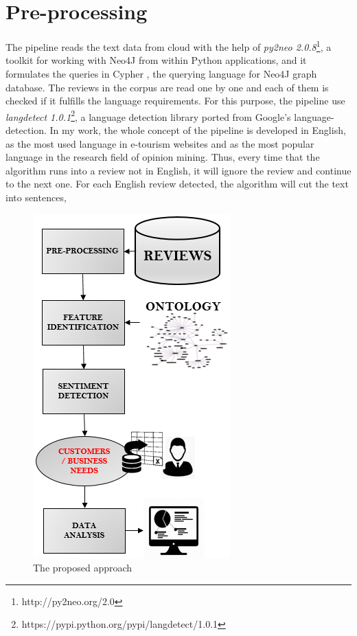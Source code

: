 \section{Pre-processing}
%
The pipeline reads the text data from cloud with the help of \textit{py2neo 2.0.8}\footnote{http://py2neo.org/2.0}, a toolkit for working with Neo4J from within Python applications, and it formulates the queries in Cypher \cite{panzarino2014learning}, the querying language for Neo4J graph database. The reviews in the corpus are read one by one and each of them is checked if it fulfills the language requirements. For this purpose, the pipeline use \textit{langdetect 1.0.1}\footnote{https://pypi.python.org/pypi/langdetect/1.0.1}, a language detection library ported from Google's language-detection. In my work, the whole concept of the pipeline is developed in English, as the most used language in e-tourism websites and as the most popular language in the research field of opinion mining. Thus, every time that the algorithm runs into a review not in English, it will ignore the review and continue to the next one. For each English review detected, the algorithm will cut the text into sentences,
\begin{figure}[h!]
	\centering
	\includegraphics[height=0.5\textheight]{pipe}
	\caption{The proposed approach}
	\label{fig:pipe}
\end{figure} 
